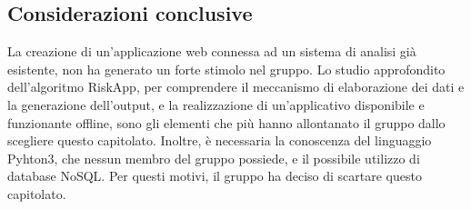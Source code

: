 \subsection{Considerazioni conclusive}

La creazione di un'applicazione web connessa ad un sistema di analisi già esistente, non ha generato un forte stimolo nel gruppo. Lo studio approfondito dell’algoritmo RiskApp, per comprendere il meccanismo di elaborazione dei dati e la generazione dell'output, e la realizzazione di un'applicativo disponibile e funzionante offline, sono gli elementi che più hanno allontanato il gruppo dallo scegliere questo capitolato. 
Inoltre, è necessaria la conoscenza del linguaggio Pyhton3, che nessun membro del gruppo possiede, e il possibile utilizzo di database NoSQL.
Per questi motivi, il gruppo ha deciso di scartare questo capitolato. 